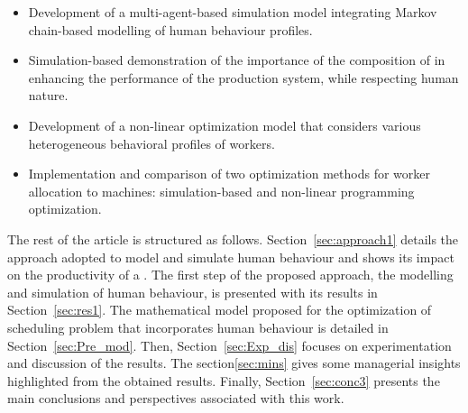 \documentclass[review,12pt, 3p, times]{elsarticle}
\begin{document}
\begin{itemize}
    \item Development of a multi-agent-based simulation model integrating Markov chain-based modelling of human behaviour profiles. 
    \item  Simulation-based demonstration of the importance of the composition of  in enhancing the performance of the production system, while respecting human nature.
    \item Development of a non-linear optimization model that considers various heterogeneous behavioral profiles of workers.
    \item Implementation and comparison of two optimization methods for worker allocation to machines: simulation-based and non-linear programming optimization. 
\end{itemize}

The rest of the article is structured as follows. Section~\ref{sec:approach1} details the approach adopted to model and simulate human behaviour and shows its impact on the productivity of a  . The first step of the proposed approach, the modelling and simulation of human behaviour, is presented with its results in Section~\ref{sec:res1}. The mathematical model proposed for the optimization of scheduling problem that incorporates human behaviour is detailed in Section~\ref{sec:Pre_mod}. Then, Section~\ref{sec:Exp_dis} focuses on experimentation and discussion of the results. The section\ref{sec:mins} gives some managerial insights highlighted from the obtained results. Finally, Section~\ref{sec:conc3} presents the main conclusions and perspectives associated with this work.
\end{document}
